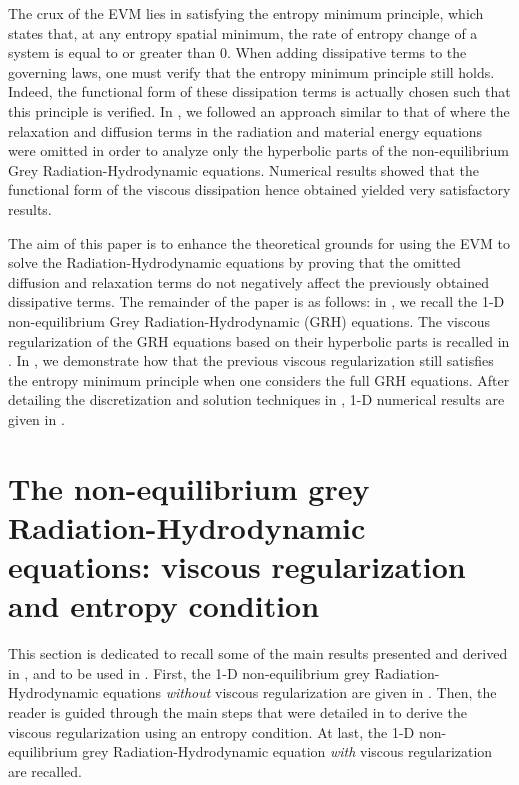 \documentclass[review]{elsarticle}
\begin{document}
The crux of the EVM lies in satisfying the entropy minimum principle, which states that, at any entropy spatial minimum, the rate of entropy change of a system is equal to or greater than 0. When
adding dissipative terms to the governing laws, one must verify that the entropy minimum principle still holds. Indeed, the functional form of these dissipation terms
is actually chosen such that this principle is verified. In \cite{our_jcp_radhy_paper}, we followed an approach similar to that of \cite{Balsara, LowrieMorel} 
where the relaxation and diffusion terms in the radiation and material energy equations were omitted in order to analyze only the hyperbolic parts of 
the non-equilibrium Grey Radiation-Hydrodynamic equations. Numerical results showed that the functional form of the viscous dissipation hence obtained 
yielded very satisfactory results. 

The aim of this paper is to enhance the theoretical grounds for using the EVM to solve the  Radiation-Hydrodynamic equations by proving that the omitted diffusion
and relaxation terms do not negatively affect the previously obtained dissipative terms. The remainder of the paper is as follows: in , we recall
the 1-D non-equilibrium Grey Radiation-Hydrodynamic (GRH) equations. The viscous regularization of the GRH equations based on their hyperbolic parts is recalled in .
In , we demonstrate how that the previous viscous regularization still satisfies the entropy minimum principle when one considers the full GRH equations.
After detailing the discretization and solution techniques in , 1-D numerical results are given in .
%
\section{The non-equilibrium grey Radiation-Hydrodynamic equations: viscous regularization and entropy condition}\label{sec:GRH}
%
This section is dedicated to recall some of the main results presented and derived in \cite{our_jcp_radhy_paper}, and to be used in . First, the 1-D  non-equilibrium grey Radiation-Hydrodynamic equations \emph{without} viscous regularization are given in . Then, the reader is guided through the main steps that were detailed in \cite{our_jcp_radhy_paper} to derive the viscous regularization using an entropy condition. At last, the 1-D non-equilibrium grey Radiation-Hydrodynamic equation \emph{with} viscous regularization are recalled.
\end{document}
